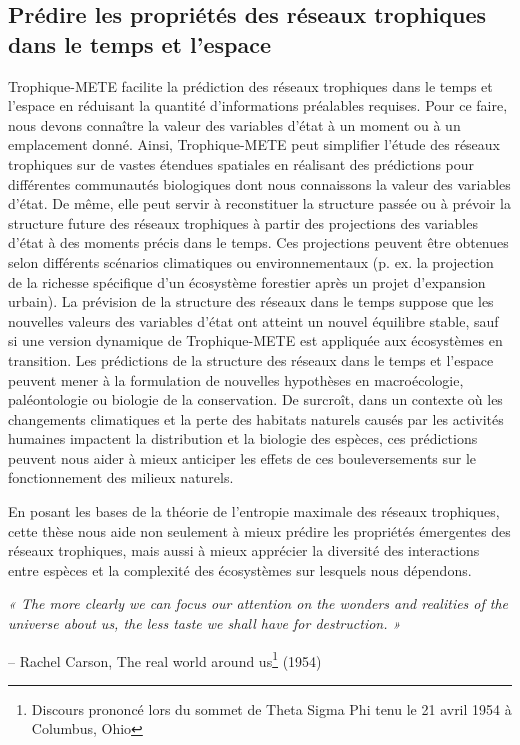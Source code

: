 \subsection{Prédire les propriétés des réseaux trophiques dans le temps et l'espace} 

Trophique-METE facilite la prédiction des réseaux trophiques dans le temps et
l'espace en réduisant la quantité d'informations préalables requises. Pour ce
faire, nous devons connaître la valeur des variables d'état à un moment ou à un
emplacement donné. Ainsi, Trophique-METE peut simplifier l'étude des réseaux
trophiques sur de vastes étendues spatiales en réalisant des prédictions pour
différentes communautés biologiques dont nous connaissons la valeur des
variables d'état. De même, elle peut servir à reconstituer la structure passée
ou à prévoir la structure future des réseaux trophiques à partir des projections
des variables d'état à des moments précis dans le temps. Ces projections peuvent
être obtenues selon différents scénarios climatiques ou environnementaux (p. ex.
la projection de la richesse spécifique d'un écosystème forestier après un
projet d'expansion urbain). La prévision de la structure des réseaux dans le
temps suppose que les nouvelles valeurs des variables d'état ont atteint un
nouvel équilibre stable, sauf si une version dynamique de Trophique-METE est
appliquée aux écosystèmes en transition. Les prédictions de la structure des
réseaux dans le temps et l'espace peuvent mener à la formulation de nouvelles
hypothèses en macroécologie, paléontologie ou biologie de la conservation. De
surcroît, dans un contexte où les changements climatiques et la perte des
habitats naturels causés par les activités humaines impactent la distribution et
la biologie des espèces, ces prédictions peuvent nous aider à mieux anticiper
les effets de ces bouleversements sur le fonctionnement des milieux naturels. 

En posant les bases de la théorie de l'entropie maximale des réseaux trophiques,
cette thèse nous aide non seulement à mieux prédire les propriétés émergentes
des réseaux trophiques, mais aussi à mieux apprécier la diversité des
interactions entre espèces et la complexité des écosystèmes sur lesquels nous
dépendons. 

\bigskip
\bigskip
\bigskip

\begingroup

\raggedleft

\textit{« The more clearly we can focus our attention on the wonders and
realities of the universe about us, the less taste we shall have for
destruction. »} 
  

– Rachel Carson, The real world around us\footnote{Discours prononcé lors du sommet de Theta Sigma Phi tenu le 21 avril 1954 à Columbus, Ohio} (1954)

\endgroup

\endinput



